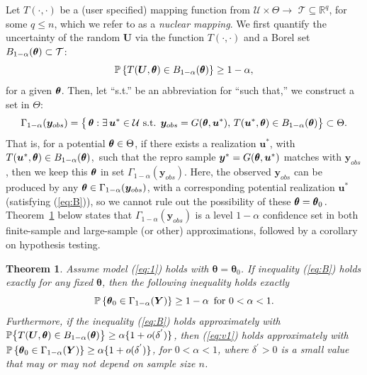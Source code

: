 \documentclass[12pt]{article}
\theoremstyle{shortspace}
\newtheorem{theorem}{Theorem}
\def\*#1{\bm{#1}}
\def\btheta{\mathop{\theta\kern-.45em\hbox{$\theta$}}\nolimits}
\def\P{\mathbb P}
\newcommand{\RR}{\mathbb{R}}
\begin{document}
Let $T(\cdot, \cdot)$ be a (user specified) mapping function from ${\mathcal U} \times \Theta \to$ ${\mathcal T} \subseteq \RR^{q}$, for some $q \leq n$, which we refer to as a {\it nuclear mapping}.
We first quantify the  uncertainty of the random $\*U$ via the function $T(\cdot, \cdot)$ and a Borel set $B_{1 -\alpha}(\btheta) \subset  {\mathcal T}$: 
\begin{equation}
    \label{eq:B}
    \P \left\{T(\*U, \btheta)  \in B_{1 -\alpha}(\btheta) \right\}\ge 1 - \alpha,
\end{equation}
for a given $\btheta$. Then, let ``s.t.'' be an abbreviation for ``such that,'' we construct a set in $\Theta$:
\begin{equation}
\label{eq:G1}
\Gamma_{1-\alpha}(\*y_{obs}) = \big\{\btheta: \exists \, \*u^* \in {\mathcal U} \mbox{ s.t. }  \*y_{obs} = 
G({\btheta}, \*u^*),
\,  
T(\*u^*, \btheta)  \in B_{1 - \alpha}(\btheta)  \big\} \subset \Theta. 
\end{equation}
That is, for a potential $\btheta \in \Theta$, if there exists a  realization $\*u^*$, with $T(\*u^*, \btheta)  \in B_{1 - \alpha}(\btheta)$,~such that the repro sample ${\*y}^* = G( {\btheta}, {\*u}^*)$ matches with  $\*y_{obs}$, then we keep this $\btheta$ in set $\Gamma_{1-\alpha}(\*y_{obs})$. Here, the observed $\*y_{obs}$ can be produced by any ${\btheta} \in \Gamma_{1-\alpha}(\*y_{obs})$, with a corresponding potential realization $\*u^*$ (satisfying (\ref{eq:B})), so we cannot rule out the possibility of these $\btheta = \btheta_0.$
Theorem~\ref{thm:1} below states that $\Gamma_{1-\alpha}(\*y_{obs})$ is a level $1 - \alpha$ confidence set in both finite-sample and large-sample (or other) approximations, followed by a corollary on hypothesis testing. 
\begin{theorem}\label{thm:1} Assume model (\ref{eq:1}) holds with $\*\theta = \*\theta_0$. If inequality (\ref{eq:B}) holds exactly for any fixed $\*\theta$, then the following inequality holds exactly 
\begin{equation}
\label{eq:v1}
\P\left\{ {\btheta}_0 \in \Gamma_{1-\alpha}(\*Y)\right\} \ge 1 - \alpha 
\,\,\, \hbox{for $ 0< \alpha <1$}.
\end{equation}
Furthermore, if the inequality (\ref{eq:B}) holds approximately 
 with $\P \big\{T(\*U, \btheta)  \in B_{1 -\alpha}(\btheta) \big\}\ge \alpha\{1 + o(\delta^{'})\}$, then (\ref{eq:v1}) holds approximately 
 with $\P\left\{ {\btheta}_0 \in \Gamma_{1-\alpha}(\*Y)\right\} \ge \alpha\{1 + o(\delta^{'})\}$, for $0< \alpha <1$, where $\delta^{'} > 0$ is 
a small value 
that may or may not
depend on sample size $n$. 
\end{theorem}
\end{document}
